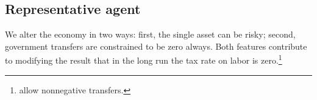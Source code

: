 \documentclass[thmsb,11pt]{article}
\begin{document}
\subsection{Representative agent}
\label{Sec: rep agent}

We alter the  \citet{Aiyagari2002} economy  in two ways:  first,  the single  asset  can  be risky; %
 second, government transfers are constrained to be zero always. Both  features
contribute to modifying  the \citeauthor{Aiyagari2002}  result that in the long run the tax rate on labor is zero.\footnote{\citeauthor{Aiyagari2002} allow nonnegative  transfers.}
\end{document}
